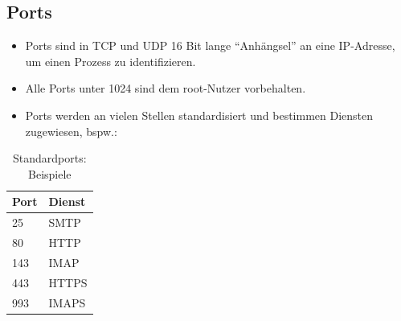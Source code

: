 \documentclass[a4paper, 11pt, accentcolor = tud3b]{tudreport}
\begin{document}
            \subsection{Ports}
                \begin{itemize}
                	\item Ports sind in TCP und UDP 16 Bit lange \enquote{Anhängsel} an eine IP-Adresse, um einen Prozess zu identifizieren.
                	\item Alle Ports unter 1024 sind dem root-Nutzer vorbehalten.
                	\item Ports werden an vielen Stellen standardisiert und bestimmen Diensten zugewiesen, bspw.:
                \end{itemize}
				\begin{table}[H]
					\centering
					\begin{tabular}{l | l}
						\textbf{Port} & \textbf{Dienst} \\ \hline
						25            & SMTP            \\
						80            & HTTP            \\
						143           & IMAP            \\
						443           & HTTPS           \\
						993           & IMAPS
					\end{tabular}
					\caption{Standardports: Beispiele}
				\end{table}
\end{document}
